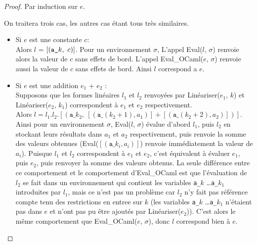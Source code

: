 \begin{proof}
    Par induction sur $e$.

    On traitera trois cas, les autres cas étant tous très similaires.

    \begin{itemize}
        \item Si $e$ est une constante $c$: \\
              Alors $l$ = $[(\textnormal{\texttt{a\_}}k,\ c)]$.  Pour un
              environnement $\sigma$, L'appel Eval($l$, $\sigma$) renvoie alors
              la valeur de $c$ sans effets de bord. L'appel
              Eval\_OCaml($e$, $\sigma$) renvoie aussi la valeur de $c$ sans
              effets de bord. Ainsi $l$ correspond a $e$.
              \bigskip

        \item Si $e$ est une addition $e_1$ + $e_2$ : \\
              Supposons que les formes linéaires $l_1$ et $l_2$ renvoyées par
              Linéariser($e_1$, $k$) et Linéariser($e_2$, $k_1$) correspondent à
              $e_1$ et $e_2$ respectivement. \\
              Alors $l = l_1.l_2.[(\texttt{a\_}k_2,\ [(\texttt{a\_}(k_2 + 1), a_1)] + [(\texttt{a\_}(k_2 + 2), a_2)])]$.
              Ainsi pour un environnement $\sigma$, Eval($l$, $\sigma$) évalue
              d'abord $l_1$, puis $l_2$ en stockant leurs résultats dans $a_1$
              et $a_2$ respectivement, puis renvoie la somme des valeurs
              obtenues (Eval($[(\texttt{a\_}k_i, a_i)]$) renvoie immédiatement
              la valeur de $a_i$). Puisque $l_1$ et $l_2$ correspondent à $e_1$
              et $e_2$, c'est équivalent à évaluer $e_1$, puis $e_2$, puis
              renvoyer la somme des valeurs obtenus. La seule différence entre
              ce comportement et le comportement d'Eval\_OCaml est que
              l'évaluation de $l_2$ se fait dans un environnement qui contient
              les variables \texttt{a\_}$k$ \ldots \texttt{a\_}$k_1$ introduites
              par $l_1$, mais ce n'est pas un problème car $l_2$ n'y fait pas
              référence compte tenu des restrictions en entree sur $k$ (les
              variables \texttt{a\_}$k$ \ldots \texttt{a\_}$k_1$ n'étaient pas
              dans $e$ et n'ont pas pu être ajoutés par Linéariser($e_2$)).
              C'est alors le même comportement que Eval\_OCaml($e$, $\sigma$),
              donc $l$ correspond bien à $e$.
              \bigskip


\end{itemize}
\end{proof}
